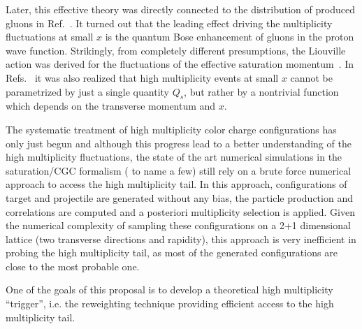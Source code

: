 Later, this effective theory was directly connected to 
the distribution of produced gluons in Ref.~\cite{Kovner:2018azs}. 
It turned out that the leading effect driving  the multiplicity 
fluctuations at small $x$ is the quantum Bose enhancement of gluons in the
proton wave function. Strikingly, from completely different presumptions,
the Liouville action was derived for the fluctuations of the effective saturation 
momentum~\cite{Iancu:2004es,Marquet:2006xm,Iancu:2007st}. 
In Refs.~\cite{Dumitru:2017cwt,Dumitru:2017ftq,Dumitru:2018iko} 
it was also realized that high multiplicity events at small $x$ 
cannot be parametrized by just a single  quantity  $Q_s$, 
but rather by a nontrivial function which depends on the transverse 
momentum and $x$. 

The systematic treatment of high multiplicity 
color charge configurations has only just begun and  
although this progress lead to a better understanding of the high multiplicity fluctuations, 
the state of the art numerical simulations in the saturation/CGC formalism 
(\cite{Mantysaari:2017cni,Mace:2018vwq,Mace:2018yvl} to name a few)
still rely 
on a brute force numerical approach to access the high multiplicity tail. 
In this approach, configurations of target and projectile are generated 
without any bias, the particle production and correlations are computed and a posteriori 
multiplicity selection is applied. 
Given the numerical complexity of sampling these configurations  on a 2+1 dimensional lattice
(two transverse directions and rapidity),  
this approach  is very inefficient in probing the 
high multiplicity tail, as most of the generated configurations are close to the most probable 
one. 

One of the goals of this proposal is to develop a theoretical high multiplicity ``trigger'', 
i.e. the reweighting technique providing  efficient access to the high multiplicity tail.   

